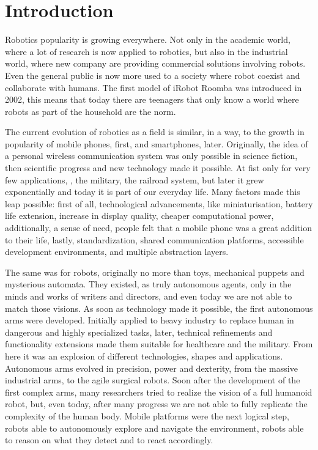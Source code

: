 \chapter{Introduction}\label{ch:introduction}
Robotics popularity is growing everywhere. Not only in the academic world, where a lot of research is now applied to robotics, but also in the industrial world, where new company are providing commercial solutions involving robots. Even the general public is now more used to a society where robot coexist and collaborate with humans. The first model of iRobot Roomba was introduced in 2002, this means that today there are teenagers that only know a world where robots as part of the household are the norm.

The current evolution of robotics as a field is similar, in a way, to the growth in popularity of mobile phones, first, and smartphones, later.  Originally, the idea of a personal wireless communication system was only possible in science fiction, then scientific progress and new technology made it possible. At fist only for very few applications, \ie, the military, the railroad system, but later it grew exponentially and today it is part of our everyday life. Many factors made this leap possible: first of all, technological advancements, like miniaturisation, battery life extension, increase in display quality, cheaper computational power, additionally, a sense of need, people felt that a mobile phone was a great addition to their life, lastly, standardization, shared communication platforms, accessible development environments, and multiple abstraction layers.

The same was for robots, originally no more than toys, mechanical puppets and mysterious automata. They existed, as truly autonomous agents, only in the minds and works of writers and directors, and even today we are not able to match those visions. As soon as technology made it possible, the first autonomous arms were developed. Initially applied to heavy industry to replace human in dangerous and highly specialized tasks, later, technical refinements and functionality extensions made them suitable for healthcare and the military. From here it was an explosion of different technologies, shapes and applications. Autonomous arms evolved in precision, power and dexterity,  from the massive industrial arms, to the agile surgical robots.  Soon after the development of the first complex arms, many researchers tried to realize the vision of a full humanoid robot, but, even today, after many progress we are not able to fully replicate the complexity of the human body. Mobile platforms were the next logical step, robots able to autonomously explore and navigate the environment, robots able to reason on what they detect and to react accordingly.

